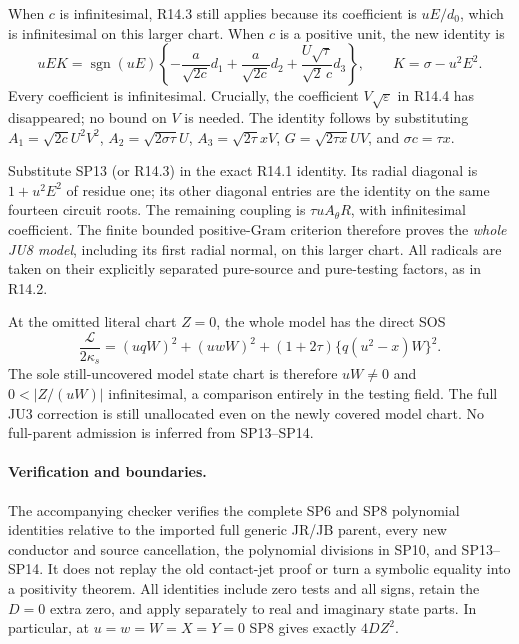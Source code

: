 When $c$ is infinitesimal, R14.3 still applies because its coefficient
is $uE/d_0$, which is infinitesimal on this larger chart.
When $c$ is a positive unit, the new identity is
\[
 uEK=\operatorname{sgn}(uE)\left\{
       -\frac{a}{\sqrt{2c}}d_1
       +\frac{a}{\sqrt{2c}}d_2
       +\frac{U\sqrt\tau}{\sqrt2\,c}d_3\right\},
 \qquad K=\sigma-u^2E^2.
 \tag{SP13}
\]
Every coefficient is infinitesimal. Crucially, the coefficient
$V\sqrt\varepsilon$ in R14.4 has disappeared; no bound on $V$ is
needed. The identity follows by substituting
$A_1=\sqrt{2c}U^2V^2$, $A_2=\sqrt{2\sigma\tau}U$,
$A_3=\sqrt{2\tau}xV$, $G=\sqrt{2\tau x}UV$,
and $\sigma c=\tau x$.

Substitute SP13 (or R14.3) in the exact R14.1 identity. Its radial
diagonal is $1+u^2E^2$ of residue one; its other diagonal entries
are the identity on the same fourteen circuit roots. The remaining
coupling is $\tau uA_\theta R$, with infinitesimal coefficient.
The finite bounded positive-Gram criterion therefore proves the
\emph{whole JU8 model}, including its first radial normal, on this
larger chart. All radicals are taken on their explicitly separated
pure-source and pure-testing factors, as in R14.2.

At the omitted literal chart $Z=0$, the whole model has the direct SOS
\[
 \frac{\mathcal L}{2\kappa_s}
   =(uqW)^2+(uwW)^2+(1+2\tau)\{q(u^2-x)W\}^2.
 \tag{SP14}
\]
The sole still-uncovered model state chart is therefore
$uW\ne0$ and $0<|Z/(uW)|$ infinitesimal, a comparison entirely in
the testing field. The full JU3 correction is still unallocated
even on the newly covered model chart. No full-parent admission is
inferred from SP13--SP14.

\paragraph{Verification and boundaries.}
The accompanying checker verifies the complete SP6 and SP8 polynomial
identities relative to the imported full generic JR/JB parent, every
new conductor and source cancellation, the polynomial divisions in
SP10, and SP13--SP14. It does not replay the old contact-jet proof or
turn a symbolic equality into a positivity theorem. All identities
include zero tests and all signs, retain the $D=0$ extra zero, and
apply separately to real and imaginary state parts. In particular,
at $u=w=W=X=Y=0$ SP8 gives exactly $4DZ^2$.
